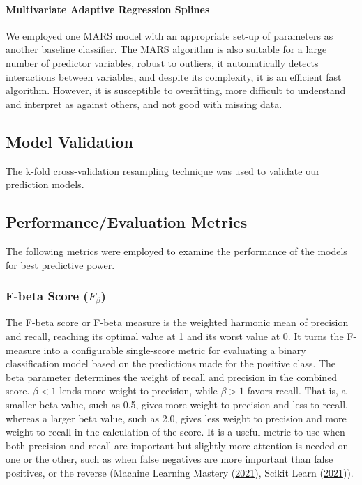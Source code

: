 \documentclass[
  10pt,
]{article}
\begin{document}
\hypertarget{multivariate-adaptive-regression-splines}{%
\paragraph{Multivariate Adaptive Regression Splines}\label{multivariate-adaptive-regression-splines}}

We employed one MARS model with an appropriate set-up of parameters as another baseline classifier. The MARS algorithm is also suitable for a large number of predictor variables, robust to outliers, it automatically detects interactions between variables, and despite its complexity, it is an efficient fast algorithm. However, it is susceptible to overfitting, more difficult to understand and interpret as against others, and not good with missing data.

\hypertarget{model-validation}{%
\subsection{Model Validation}\label{model-validation}}

The k-fold cross-validation resampling technique was used to validate our prediction models.

\hypertarget{performanceevaluation-metrics}{%
\subsection{Performance/Evaluation Metrics}\label{performanceevaluation-metrics}}

The following metrics were employed to examine the performance of the models for best predictive power.

\hypertarget{f-beta-score-f_beta}{%
\subsubsection{\texorpdfstring{F-beta Score (\(F_\beta\))}{F-beta Score (F\_\textbackslash beta)}}\label{f-beta-score-f_beta}}

The F-beta score or F-beta measure is the weighted harmonic mean of precision and recall, reaching its optimal value at 1 and its worst value at 0. It turns the F-measure into a configurable single-score metric for evaluating a binary classification model based on the predictions made for the positive class. The beta parameter determines the weight of recall and precision in the combined score. \(\beta < 1\) lends more weight to precision, while \(\beta > 1\) favors recall. That is, a smaller beta value, such as 0.5, gives more weight to precision and less to recall, whereas a larger beta value, such as 2.0, gives less weight to precision and more weight to recall in the calculation of the score. It is a useful metric to use when both precision and recall are important but slightly more attention is needed on one or the other, such as when false negatives are more important than false positives, or the reverse (Machine Learning Mastery (\protect\hyperlink{ref-MLM}{2021}), Scikit Learn (\protect\hyperlink{ref-scikit_learn}{2021})).
\end{document}
